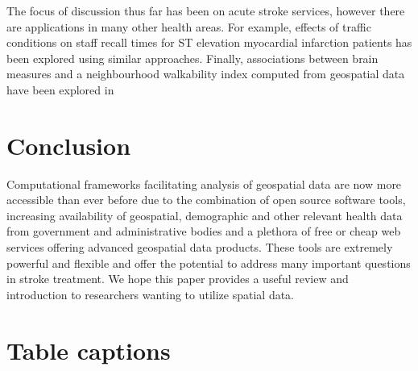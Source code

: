 \documentclass[utf8]{frontiersHLTH}
\begin{document}
The focus of discussion thus far has been on acute stroke services,
however there are applications in many other health areas. For
example, effects of traffic conditions on staff recall times for ST
elevation myocardial infarction patients has been explored using
similar approaches\cite{10.3389/fcvm.2017.00089}. Finally,
associations between brain measures and a neighbourhood walkability
index computed from geospatial data have been explored in
\cite{cerin2017associations}

\section{Conclusion}
Computational frameworks facilitating analysis of geospatial data are
now more accessible than ever before due to the combination of open
source software tools, increasing availability of geospatial,
demographic and other relevant health data from government and
administrative bodies and a plethora of free or cheap web services
offering advanced geospatial data products. These tools are extremely
powerful and flexible and offer the potential to address many
important questions in stroke treatment. We hope this paper provides a
useful review and introduction to researchers wanting to utilize
spatial data.




\section*{Table captions}
\end{document}
